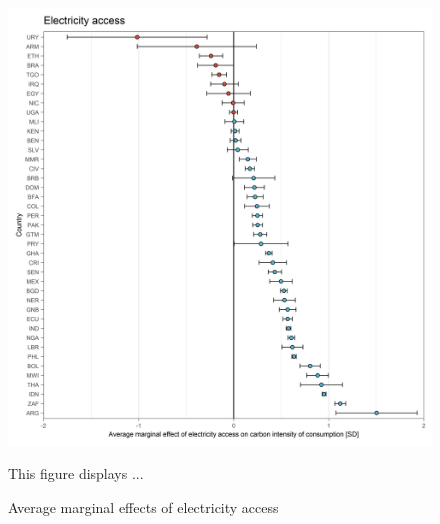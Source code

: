 \documentclass[12pt, a4paper]{article}
\newenvironment{subcaption}
{\strut
\vspace{-5pt}
\begin{minipage}[b]{0.9\textwidth}
  \hspace*{-\parindent}
  \footnotesize}
 {\end{minipage}}
\begin{document}
\begin{figure}[ht!]
  \centering
 \caption{Average marginal effects of electricity access} \label{fig:E2_Electricity}
  \includegraphics{Analysis_OLS_ME_Carbon_Intensity/AME_OLS_CI_electricity.access}
  \begin{subcaption}
    This figure displays ...
  \end{subcaption}

\end{figure}

\clearpage
\end{document}
